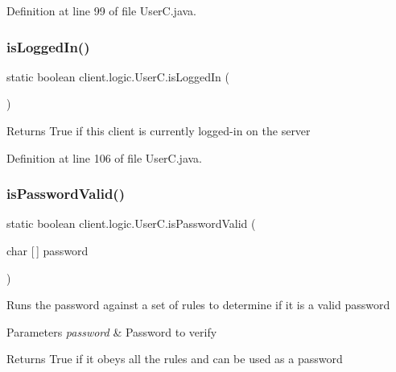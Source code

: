 Definition at line 99 of file User\+C.\+java.

\hypertarget{classclient_1_1logic_1_1_user_c_ad4fb84e487e917c202a4e1bcdea62dd5}{}\label{classclient_1_1logic_1_1_user_c_ad4fb84e487e917c202a4e1bcdea62dd5} 
\subsubsection{\texorpdfstring{is\+Logged\+In()}{isLoggedIn()}}
{\footnotesize\ttfamily static boolean client.\+logic.\+User\+C.\+is\+Logged\+In (\begin{DoxyParamCaption}{ }\end{DoxyParamCaption})\hspace{0.3cm}{\ttfamily [static]}}

\begin{DoxyReturn}{Returns}
True if this client is currently logged-\/in on the server 
\end{DoxyReturn}


Definition at line 106 of file User\+C.\+java.

\hypertarget{classclient_1_1logic_1_1_user_c_a724d1799c3963f516238cdf0d85ccf52}{}\label{classclient_1_1logic_1_1_user_c_a724d1799c3963f516238cdf0d85ccf52} 
\subsubsection{\texorpdfstring{is\+Password\+Valid()}{isPasswordValid()}}
{\footnotesize\ttfamily static boolean client.\+logic.\+User\+C.\+is\+Password\+Valid (\begin{DoxyParamCaption}\item[{char \mbox{[}$\,$\mbox{]}}]{password }\end{DoxyParamCaption})\hspace{0.3cm}{\ttfamily [static]}}

Runs the password against a set of rules to determine if it is a valid password


\begin{DoxyParams}{Parameters}
{\em password} & Password to verify \\
\hline
\end{DoxyParams}
\begin{DoxyReturn}{Returns}
True if it obeys all the rules and can be used as a password 
\end{DoxyReturn}


